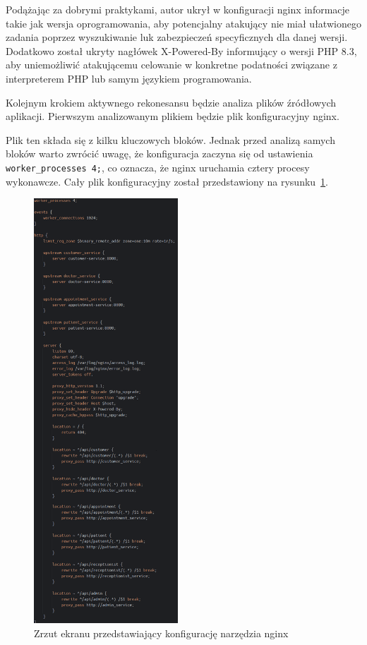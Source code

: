 \documentclass[12pt,oneside]{book}
\newcommand{\captionvspace}{\vspace{6pt}}
\begin{document}
    Podążając za dobrymi praktykami, autor ukrył w konfiguracji nginx informacje takie jak wersja oprogramowania, aby potencjalny atakujący nie miał ułatwionego zadania poprzez wyszukiwanie luk zabezpieczeń specyficznych dla danej wersji. Dodatkowo został ukryty nagłówek X-Powered-By informujący o wersji PHP 8.3, aby uniemożliwić atakującemu celowanie w konkretne podatności związane z interpreterem PHP lub samym językiem programowania.

    Kolejnym krokiem aktywnego rekonesansu będzie analiza plików źródłowych aplikacji. Pierwszym analizowanym plikiem będzie plik konfiguracyjny nginx.

    Plik ten składa się z kilku kluczowych bloków. Jednak przed analizą samych bloków warto zwrócić uwagę, że konfiguracja zaczyna się od ustawienia \texttt{worker\_processes 4;}, co oznacza, że nginx uruchamia cztery procesy wykonawcze. Cały plik konfiguracyjny został przedstawiony na rysunku~\ref{fig:nginx-config}.

    \begin{figure}[ht]
        \centering
        \includegraphics[width=0.48\textwidth]{includes/images/nginx-configuration.png}
        \captionvspace
        \caption{Zrzut ekranu przedstawiający konfigurację narzędzia nginx}
        \label{fig:nginx-config}
    \end{figure}
\end{document}
